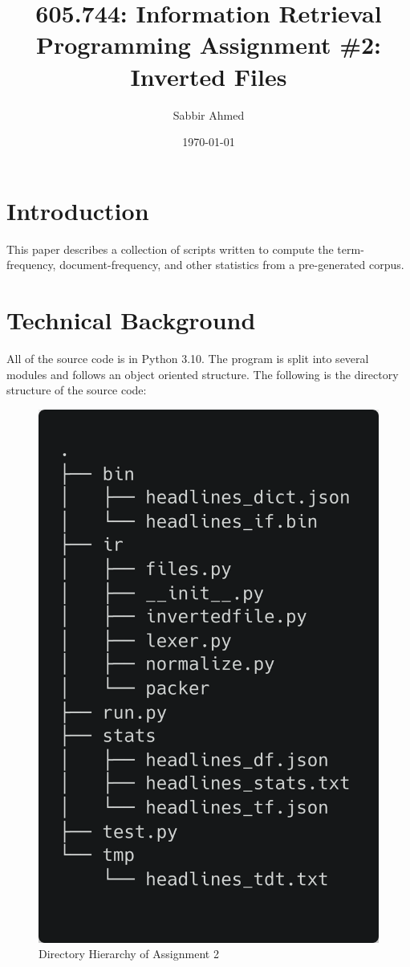 \documentclass[11pt]{article}
\title{605.744: Information Retrieval \\ Programming Assignment \#2: Inverted Files}
\author{Sabbir Ahmed}
\date{\today}
\begin{document}
\maketitle	

\section{Introduction}
This paper describes a collection of scripts written to compute the term-frequency, document-frequency, and other statistics from a pre-generated corpus.

\section{Technical Background}
All of the source code is in Python 3.10. The program is split into several modules and follows an object oriented structure. The following is the directory structure of the source code:

\begin{figure}[!ht]
    \caption{Directory Hierarchy of Assignment 2}
    \centering
    \includegraphics[scale=0.2]{statics/dirtree.png}
\end{figure}
\end{document}
